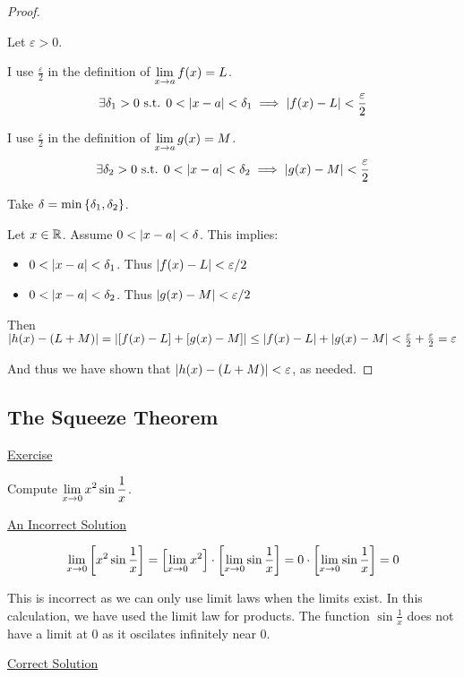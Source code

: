 \begin{proof} \(\)

  Let \(\varepsilon > 0\).

  I use \(\frac{\varepsilon}{2}\) in the definition of \(\displaystyle \lim_{x \to a} f(x) = L\). \[\exists \delta_{1} > 0 \text{ s.t. } 0 < \left|x - a\right| < \delta_{1} \implies \left|f(x) - L\right| < \frac{\varepsilon}{2}\]

  I use \(\frac{\varepsilon}{2}\) in the definition of \(\displaystyle \lim_{x \to a} g(x) = M\). \[\exists \delta_{2} > 0 \text{ s.t. } 0 < \left|x - a\right| < \delta_{2} \implies \left|g(x) - M\right| < \frac{\varepsilon}{2}\]

  Take \(\delta = \min\left\{\delta_{1}, \delta_{2}\right\}\).

  Let \(x \in \mathbb{R}\). Assume \(0 < \left|x - a\right| < \delta\). This implies:
  \begin{itemize}
    \item \(0 < \left|x - a\right| < \delta_{1}\). Thus \(\left|f(x) - L\right| < \varepsilon/2\)
    \item \(0 < \left|x - a\right| < \delta_{2}\). Thus \(\left|g(x) - M\right| < \varepsilon/2\)
  \end{itemize}

  Then \(\left|h(x) - \left(L + M\right)\right| = \left|\left[f(x) - L\right] + \left[g(x) - M\right]\right| \leq \left|f(x) - L\right| + \left|g(x) - M\right| < \frac{\varepsilon}{2} + \frac{\varepsilon}{2} = \varepsilon\)

  And thus we have shown that \(\left|h(x) - \left(L + M\right)\right| < \varepsilon\), as needed. \qedhere
\end{proof}

\subsection{The Squeeze Theorem}

\underline{Exercise}

Compute \(\displaystyle \lim_{x \to 0} x^{2} \sin \frac{1}{x}\).

\underline{An {\color{red}Incorrect} Solution}

\[\lim_{x \to 0} \left[x^{2} \sin \frac{1}{x}\right] = \left[\lim_{x \to 0} x^{2}\right] \cdot \left[\lim_{x \to 0} \sin \frac{1}{x}\right] = 0 \cdot \left[\lim_{x \to 0} \sin \frac{1}{x}\right] = 0\]

This is incorrect as we can only use limit laws when the limits exist. In this calculation, we have used the limit law for products. The function \(\sin \frac{1}{x}\) does not have a limit at \(0\) as it oscilates infinitely near \(0\).

\underline{Correct Solution}


